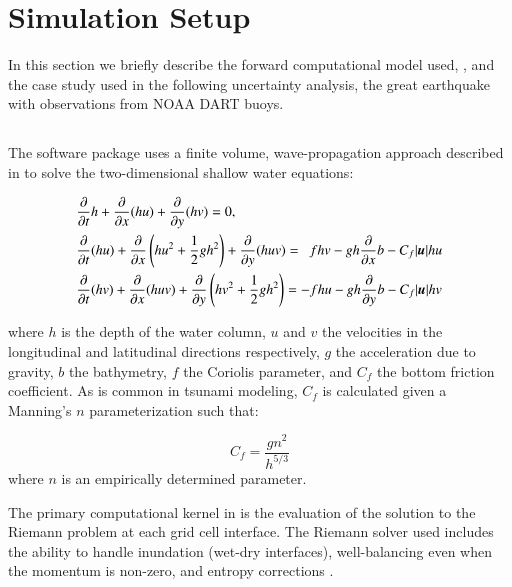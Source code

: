 
\section{Simulation Setup}

In this section we briefly describe the forward computational model used, \geoclaw, and the case study used in the following uncertainty analysis, the great \tohoku earthquake with observations from NOAA DART buoys.

\subsection{\geoclaw} \label{ssub:geoclaw}

The \geoclaw software package uses a finite volume, wave-propagation approach described in \cite{LeVeque:1997eg} to solve the two-dimensional shallow water equations:

\begin{equation} \label{eq:swe}
    \begin{aligned}
    &\pd{}{t} h + \pd{}{x} (hu) + \pd{}{y} (hv) = 0, \\
    &\pd{}{t}(hu) + \pd{}{x} \left(hu^2 + \frac{1}{2} g h^2 \right ) + \pd{}{y} (huv) = ~~ fhv - gh \pd{}{x} b - C_f |\vec{u}| hu \\
    &\pd{}{t} (hv) + \pd{}{x} (huv) + \pd{}{y} \left (hv^2 + \frac{1}{2} gh^2 \right) = -fhu - gh \pd{}{y} b - C_f |\vec{u}| hv
    \end{aligned}
\end{equation}

where $h$ is the depth of the water column, $u$ and $v$ the velocities in the 
longitudinal and latitudinal directions respectively, $g$ the acceleration due 
to gravity, $b$ the bathymetry, $f$ the Coriolis parameter, and $C_f$ the bottom 
friction coefficient.  As is common in tsunami modeling, $C_f$ is calculated 
given a Manning's $n$ parameterization such that:

\begin{equation}
    C_f = \frac{g n^2}{h^{5/3}}
\end{equation}
where $n$ is an empirically determined parameter.  

The primary computational kernel in \geoclaw is the evaluation of the solution to the Riemann problem at each grid cell interface.  The Riemann solver used includes the ability to handle inundation (wet-dry interfaces), well-balancing even when the momentum is non-zero, and entropy corrections \cite{George:2008aa}.

